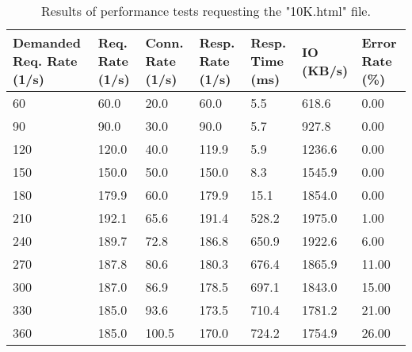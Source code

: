 \begin{table}[H]
  \centering
    \begin{tabular}{|m{2.5cm}|m{2cm}|m{2cm}|m{2cm}|m{2cm}|m{2cm}|m{2cm}|}
    \hline
    \textbf{Demanded Req. Rate} (1/s) & \textbf{Req. Rate} (1/s) & \textbf{Conn. Rate} (1/s) & \textbf{Resp. Rate} (1/s) & \textbf{Resp. Time} (ms) & \textbf{IO} (KB/s) & \textbf{Error Rate} (\%) \\
    \hline
    60 & 60.0 & 20.0 & 60.0 & 5.5 & 618.6 & 0.00 \\
    90 & 90.0 & 30.0 & 90.0 & 5.7 & 927.8 & 0.00 \\
    120 & 120.0 & 40.0 & 119.9 & 5.9 & 1236.6 & 0.00 \\
    150 & 150.0 & 50.0 & 150.0 & 8.3 & 1545.9 & 0.00 \\
    180 & 179.9 & 60.0 & 179.9 & 15.1 & 1854.0 & 0.00 \\
    210 & 192.1 & 65.6 & 191.4 & 528.2 & 1975.0 & 1.00 \\
    240 & 189.7 & 72.8 & 186.8 & 650.9 & 1922.6 & 6.00 \\
    270 & 187.8 & 80.6 & 180.3 & 676.4 & 1865.9 & 11.00 \\
    300 & 187.0 & 86.9 & 178.5 & 697.1 & 1843.0 & 15.00 \\
    330 & 185.0 & 93.6 & 173.5 & 710.4 & 1781.2 & 21.00 \\
    360 & 185.0 & 100.5 & 170.0 & 724.2 & 1754.9 & 26.00 \\
    \hline
    \end{tabular}
  \caption{Results of performance tests requesting the "10K.html" file.}
  \label{tab:perf-res-10k}
\end{table}
\hspace{2cm}


